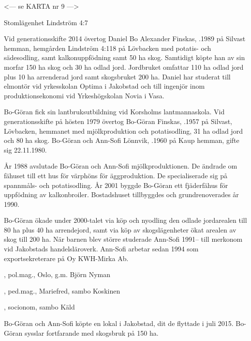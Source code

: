 
<--- se KARTA nr 9 --->


Stomlägenhet Lindström 4:7


Vid generationsskifte 2014 övertog Daniel Bo Alexander Finskas, .1989 på Silvast hemman, hemgården Lindström 4:118 på Lövbacken med potatis- och sädesodling, samt kalkonuppfödning samt 50 ha skog. Samtidigt köpte han av sin morfar 150 ha skog och 30 ha odlad jord. Jordbruket omfattar 110 ha odlad jord plus 10 ha arrenderad jord samt skogsbruket 200 ha. Daniel har studerat till elmontör vid yrkesskolan Optima i Jakobstad och till ingenjör inom produktionsekonomi vid Yrkeshögskolan Novia i Vasa.


Bo-Göran fick sin lantbruksutbildning vid Korsholms lantmannaskola. Vid generationsskifte på hösten 1979 övertog Bo-Göran Finskas, .1957 på Silvast, Lövbacken, hemmanet med mjölkproduktion och potatisodling, 31 ha odlad jord och 80 ha skog. Bo-Göran och Ann-Sofi Lönnvik, .1960 på Kaup hemman, gifte sig 22.11.1980.

År 1988 avslutade Bo-Göran och Ann-Sofi mjölkproduktionen. De ändrade om fähuset till ett hus för värphöns för äggproduktion. De specialiserade sig på spannmåls- och potatisodling. År 2001 byggde Bo-Göran ett fjäderfähus för uppfödning av kalkonbroiler. Bostadshuset tillbyggdes och grundrenoverades år 1990.

Bo-Göran ökade under 2000-talet via köp och nyodling den odlade jordarealen till 80 ha plus 40 ha arrendejord, samt via köp av skogslägenheter ökat arealen av skog till 200 ha. När 	barnen blev större studerade Ann-Sofi 1991-- till merkonom vid 	Jakobstads handelsläroverk. Ann-Sofi arbetar sedan 1994 som exportsekreterare på Oy KWH-Mirka Ab.
\begin{jhchildren}
  \item {}, pol.mag., Oslo, g.m. Björn Nyman
  \item {}, ped.mag., Mariefred, sambo Koskinen
  \item {}, socionom, sambo Käld
  \item {}
\end{jhchildren}
Bo-Göran och Ann-Sofi köpte en lokal i Jakobstad, dit de flyttade i juli 2015. Bo-Göran sysslar fortfarande med skogsbruk på 150 ha.


